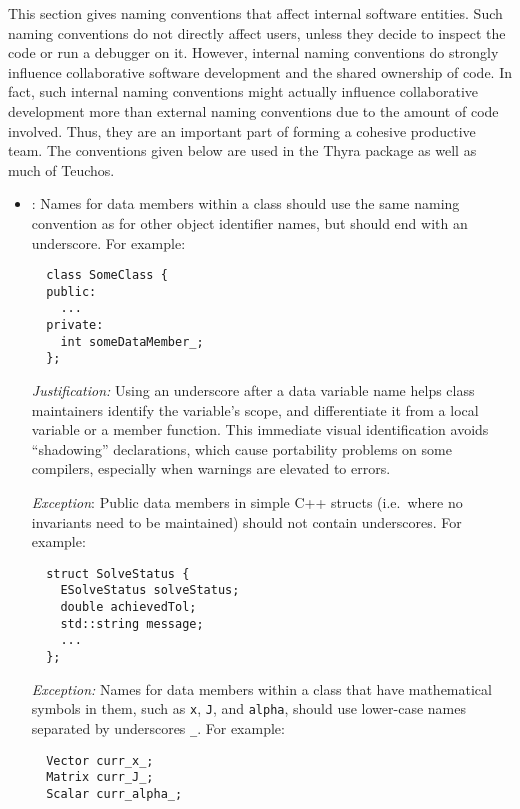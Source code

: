 This section gives naming conventions that affect internal software
entities.  Such naming conventions do not directly affect users,
unless they decide to inspect the code or run a debugger on it.
However, internal naming conventions do strongly influence
collaborative software development and the shared ownership of code.
In fact, such internal naming conventions might actually influence
collaborative development more than external naming conventions due to
the amount of code involved.  Thus, they are an important part of
forming a cohesive productive team.  The conventions given below are
used in the Thyra package as well as much of Teuchos.


\begin{itemize}
\item\NCDataMemberNames: Names for data members within a class should
  use the same naming convention as for other object identifier names,
  but should end with an underscore.  For example:

{\small\begin{verbatim}
  class SomeClass {
  public:
    ...
  private:
    int someDataMember_;
  };
\end{verbatim}}

  \textit{Justification:} Using an underscore after a data variable
  name helps class maintainers identify the variable's scope, and
  differentiate it from a local variable or a member function.  This
  immediate visual identification avoids ``shadowing'' declarations,
  which cause portability problems on some compilers, especially when
  warnings are elevated to errors.

  \textit{Exception}: Public data members in simple C++ structs (i.e.\
  where no invariants need to be maintained) should not contain
  underscores.  For example:

{\small\begin{verbatim}
  struct SolveStatus {
    ESolveStatus solveStatus;
    double achievedTol;
    std::string message;
    ...
  };
\end{verbatim}}

  \textit{Exception:} Names for data members within a class that have
  mathematical symbols in them, such as {}\texttt{x}, {}\texttt{J},
  and {}\texttt{alpha}, should use lower-case names separated by
  underscores {}\texttt{\_}.  For example:

{\small\begin{verbatim}
  Vector curr_x_;
  Matrix curr_J_;
  Scalar curr_alpha_;
\end{verbatim}}


\end{itemize}
